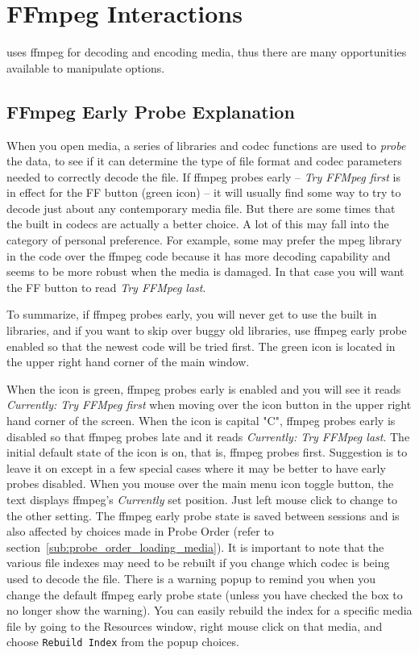 \chapter{FFmpeg Interactions}%
\label{cha:ffmpeg_interactions}

\CGG{} uses ffmpeg for decoding and encoding media, thus there are many opportunities available to manipulate options.

\section{FFmpeg Early Probe Explanation}%
\label{sec:ffmpeg_early_probe_explanation}

When you open media, a series of libraries and codec functions are used to \textit{probe} the data, to see if it can determine the type of file format and codec parameters needed to correctly decode the file.  If ffmpeg probes early -- \textit{Try FFMpeg first} is in effect for the FF button (green icon) -- it will usually find some way to try to decode just about any contemporary media file.  But there are some times that the built in codecs are actually a better choice.  A lot of this may fall into the category of personal preference.  For example, some may prefer the mpeg library in the \CGG{} code over the ffmpeg code because it has more decoding capability and seems to be more robust when the media is damaged.  In that case you will want the FF button to read \textit{Try FFMpeg last}.

To summarize, if ffmpeg probes early, you will never get to use the built in libraries, and if you want to skip over buggy old libraries, use ffmpeg early probe enabled so that the newest code will be tried first.
The green icon is located in the upper right hand corner of the main window.

When the icon is green, ffmpeg probes early is enabled and you will see it reads
 \textit{Currently: Try FFMpeg first} when moving over the icon button in the upper 
right hand corner of the screen.  When the icon is capital "C", ffmpeg probes early is disabled so that 
ffmpeg probes late and it reads \textit{Currently: Try FFMpeg last}.  The initial default state of 
the icon is on, that is, ffmpeg probes first. Suggestion is to leave it on except in a few special 
cases where it may be better to have early probes disabled.  When you mouse over the main menu icon 
toggle button, the text displays ffmpeg's \textit{Currently} set position.  Just left mouse click to change to the other setting.
The ffmpeg early probe state is saved between sessions and is also affected by choices made in Probe Order (refer to section~\ref{sub:probe_order_loading_media}). It is important to note that the various file indexes may need to be rebuilt if you change which codec is being used to decode the file.  There is a warning popup to remind you when you change the default ffmpeg early probe state (unless you have checked the box to no longer show the warning).  You can easily rebuild the index for a specific media file by going to the Resources window, right mouse click on that media, and choose \texttt{Rebuild Index} from the popup choices.

